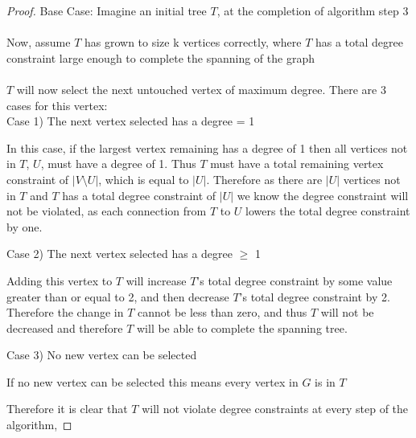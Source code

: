 \documentclass{article}
\begin{document}
\begin{proof}
Base Case: Imagine an initial tree $T$, at the completion of algorithm step 3
\\
\\
Now, assume $T$ has grown to size k vertices correctly, where $T$ has a total degree constraint large enough to complete the spanning of the graph
\\\\
$T$ will now select the next untouched vertex of maximum degree. There are 3 cases for this vertex:
\\

    \setlength\parindent{12pt} 
    Case 1) The next vertex selected has a degree = 1 \par
        \setlength\parindent{24pt}\hangindent=24pt 
        In this case, if the largest vertex remaining has a degree of 1 then all vertices not in $T$, $U$, must
        have a degree of 1. Thus $T$ must have a total remaining vertex constraint of $|V \setminus U|$, which is equal to  $|U|$. Therefore as there are $|U|$ vertices not in $T$ and $T$ has a total degree constraint of $|U|$ we know the degree constraint will not be violated, as each connection from $T$ to $U$ lowers the total degree constraint by one.
        \par
        
    \setlength\parindent{12pt}
    Case 2) The next vertex selected has a degree $\geq$ 1\par
        \setlength\parindent{24pt}\hangindent=24pt 
        Adding this vertex to $T$ will increase $T$'s total degree constraint by some value greater than or equal to 2, and then decrease $T$'s total degree constraint by 2.
        Therefore the change in $T$ cannot be less than zero, and thus $T$ will not be decreased and therefore $T$ will be able to complete the spanning tree.
        \par

    \setlength\parindent{12pt}
    Case 3) No new vertex can be selected\par
        \setlength\parindent{24pt}\hangindent=24pt 
        If no new vertex can be selected this means every vertex in $G$ is in $T$
        \par
        
    \setlength\parindent{0pt}\hangindent=0pt
    Therefore it is clear that $T$ will not violate degree constraints at every step of the algorithm,

\end{proof}
\end{document}
